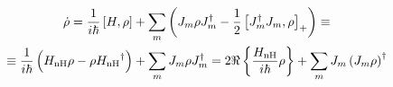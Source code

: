 \documentclass[a4paper]{article}
\begin{document}
\begin{multline}
\dot\rho=
\frac1{i\hbar}\left[H,\rho\right]+\sum_m\left({J_m\rho{J_m^\dag}-\frac12\left[J_m^\dag J_m,\rho\right]_+}\right)\equiv\\\equiv
\frac1{i\hbar}\left({H_{\text{nH}}}\rho-\rho{H_{\text{nH}}}^\dag\right)+\sum_mJ_m\rho{J_m^\dag}=2\Re\left\{\frac{{H_{\text{nH}}}}{i\hbar}\rho\right\}+\sum_mJ_m\left({J_m\rho}\right)^\dag
\end{multline}
\end{document}
